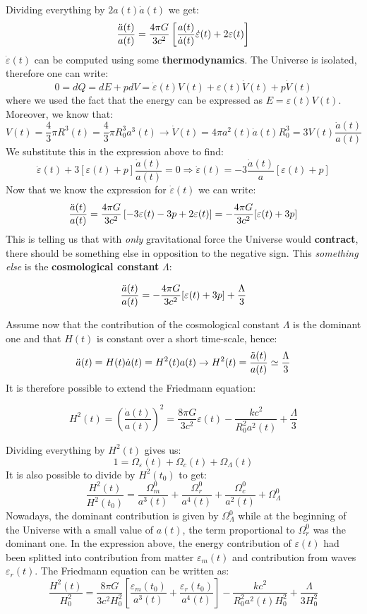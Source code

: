 \documentclass[10.75pt,a4paper,openright,bottom=2cm]{article}
\newcommand{\beginbox}[1]{\begin{tcolorbox}[width=\textwidth,colback={black!40},title={#1},colbacktitle={purple!55},coltitle=black]}
\renewcommand{\endbox}{\end{tcolorbox}\noindent}
\begin{document}
Dividing everything by $2a(t)\Dot{a}(t)$ we get:
\[
\frac{\Ddot{a}(t)}{a(t)}=\frac{4\pi G}{3c^2}\left[\frac{a(t)}{\Dot{a}(t)}\Dot{\varepsilon}(t)+2\varepsilon(t)\right]
\]
$\Dot{\varepsilon}(t)$ can be computed using some \textbf{thermodynamics}. The Universe is isolated, therefore one can write:
\[
0=dQ=dE+pdV=\Dot{\varepsilon}(t)V(t)+\varepsilon(t)\Dot{V}(t)+p\Dot{V}(t)
\]
where we used the fact that the energy can be expressed as $E=\varepsilon(t)V(t)$. Moreover, we know that:
\[
V(t)=\frac{4}{3}\pi R^3(t)=\frac{4}{3}\pi R_0^3a^3(t)\to\Dot{V}(t)=4\pi a^2(t)\Dot{a}(t)R_0^3=3V(t)\frac{\Dot{a}(t)}{a(t)}
\]
We substitute this in the expression above to find:
\[
\Dot{\varepsilon}(t)+3[\varepsilon(t)+p]\frac{\Dot{a}(t)}{a(t)}=0\Rightarrow\Dot{\varepsilon}(t)=-3\frac{\Dot{a}(t)}{a}[\varepsilon(t)+p]
\]
Now that we know the expression for $\Dot{\varepsilon}(t)$ we can write:
\[
\frac{\Ddot{a}(t)}{a(t)}=\frac{4\pi G}{3c^2}\left[-3\varepsilon(t)-3p+2\varepsilon(t)\right]=-\frac{4\pi G}{3c^2}[\varepsilon(t)+3p]
\]
This is telling us that with \textit{only} gravitational force the Universe would \textbf{contract}, there should be something else in opposition to the negative sign. This \textit{something else} is the \textbf{cosmological constant} $\Lambda$:
\beginbox{Cosmological Constant} 
\[
\frac{\Ddot{a}(t)}{a(t)}=-\frac{4\pi G}{3c^2}[\varepsilon(t)+3p]+\frac{\Lambda}{3}
\]
\endbox
Assume now that the contribution of the cosmological constant $\Lambda$ is the dominant one and that $H(t)$ is constant over a short time-scale, hence:
\[
\Ddot{a}(t)=H(t)\Dot{a}(t)=H^2(t)a(t)\to H^2(t)=\frac{\Ddot{a}(t)}{a(t)}\simeq\frac{\Lambda}{3}
\]
It is therefore possible to extend the Friedmann equation:
\beginbox{Full Metal Friedmann Equation}
\[
H^2(t)=\left(\frac{\Dot{a}(t)}{a(t)}\right)^2=\frac{8\pi G}{3c^2}\varepsilon(t)-\frac{kc^2}{R_0^2a^2(t)}+\frac{\Lambda}{3}
\]
\endbox
Dividing everything by $H^2(t)$ gives us:
\[
1=\Omega_\varepsilon(t)+\Omega_c(t)+\Omega_\Lambda(t)
\]
It is also possible to divide by $H^2(t_0)$ to get:
\[
\frac{H^2(t)}{H^2(t_0)}=\frac{\Omega_m^0}{a^3(t)}+\frac{\Omega_r^0}{a^4(t)}+\frac{\Omega_c^0}{a^2(t)}+\Omega_\Lambda^0
\]
Nowadays, the dominant contribution is given by $\Omega_\Lambda^0$ while at the beginning of the Universe with a small value of $a(t)$, the term proportional to $\Omega_r^0$ was the dominant one. In the expression above, the energy contribution of $\varepsilon(t)$ had been splitted into contribution from matter $\varepsilon_m(t)$ and contribution from waves $\varepsilon_r(t)$. The Friedmann equation can be written as:
\[
\frac{H^2(t)}{H_0^2}=\frac{8\pi G}{3c^2H_0^2}\left[\frac{\varepsilon_m(t_0)}{a^3(t)}+\frac{\varepsilon_r(t_0)}{a^4(t)}\right]-\frac{kc^2}{R_0^2a^2(t)H_0^2}+\frac{\Lambda}{3H_0^2}
\]
\end{document}
